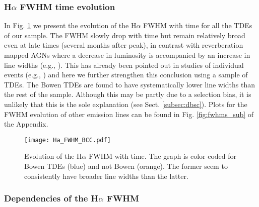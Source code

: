 \documentclass[structabstract]{aa}
\begin{document}
\subsubsection{H$\alpha$ FWHM time evolution} \label{subsub:hafe}
In Fig. \ref{fig:Ha_FWHMs_BCC} we present the evolution of the H$\alpha$ FWHM with time for all the TDEs of our sample. The FWHM slowly drop with time but remain relatively broad even at late times (several months after peak), in contrast with reverberation mapped AGNs where a decrease in luminosity is accompanied by an increase in line widths (e.g., \citealt{Peterson2004, Denney2008}). This has already been pointed out in studies of individual events (e.g., \citealt{Holoien2016}) and here we further strengthen this conclusion using a sample of TDEs. The Bowen  TDEs are found to have systematically lower line widths than the rest of the sample. Although this may be partly due to a selection bias, it is unlikely that this is the sole explanation (see Sect. \ref{subsec:dbsc}).
Plots for the FWHM evolution of other emission lines can be found in Fig. \ref{fig:fwhms_sub} of the Appendix. 


\begin{figure}
\centering
\texttt{[image: Ha\_FWHM\_BCC.pdf]}
\caption{Evolution of the H$\alpha$ FWHM with time. The graph is color coded for Bowen  TDEs (blue) and not Bowen (orange). The former seem to consistently have broader line widths than the latter.
}\label{fig:Ha_FWHMs_BCC}
\end{figure}



\subsubsection{Dependencies of the H$\alpha$ FWHM}
\label{subsub:habhlp}
\end{document}

